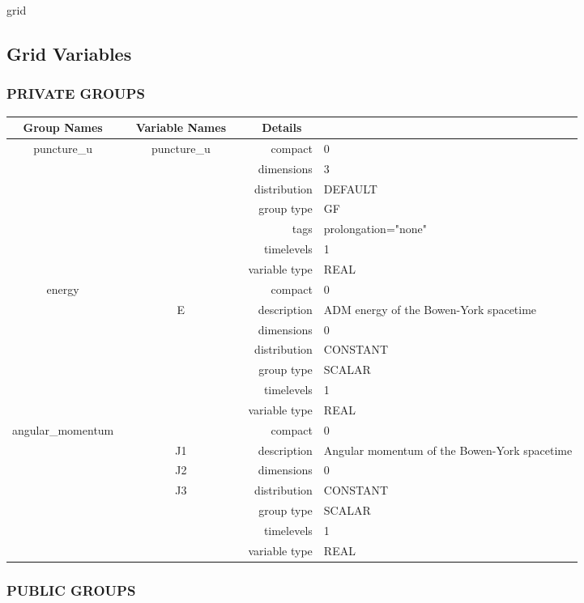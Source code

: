 grid
\vspace{2mm}
\subsection*{Grid Variables}
\vspace{5mm}\subsubsection{PRIVATE GROUPS}

\vspace{5mm}

\begin{tabular*}{150mm}{|c|c@{\extracolsep{\fill}}|rl|} \hline 
~ {\bf Group Names} ~ & ~ {\bf Variable Names} ~  &{\bf Details} ~ & ~\\ 
\hline 
puncture\_u & puncture\_u & compact & 0 \\ 
 &  & dimensions & 3 \\ 
 &  & distribution & DEFAULT \\ 
 &  & group type & GF \\ 
 &  & tags & prolongation="none" \\ 
 &  & timelevels & 1 \\ 
 &  & variable type & REAL \\ 
\hline 
energy &  & compact & 0 \\ 
 & E & description & ADM energy of the Bowen-York spacetime \\ 
 &  & dimensions & 0 \\ 
 &  & distribution & CONSTANT \\ 
 &  & group type & SCALAR \\ 
 &  & timelevels & 1 \\ 
 &  & variable type & REAL \\ 
\hline 
angular\_momentum &  & compact & 0 \\ 
 & J1 & description & Angular momentum of the Bowen-York spacetime \\ 
 & J2 & dimensions & 0 \\ 
 & J3 & distribution & CONSTANT \\ 
 &  & group type & SCALAR \\ 
 &  & timelevels & 1 \\ 
 &  & variable type & REAL \\ 
\hline 
\end{tabular*} 


\vspace{5mm}\subsubsection{PUBLIC GROUPS}

